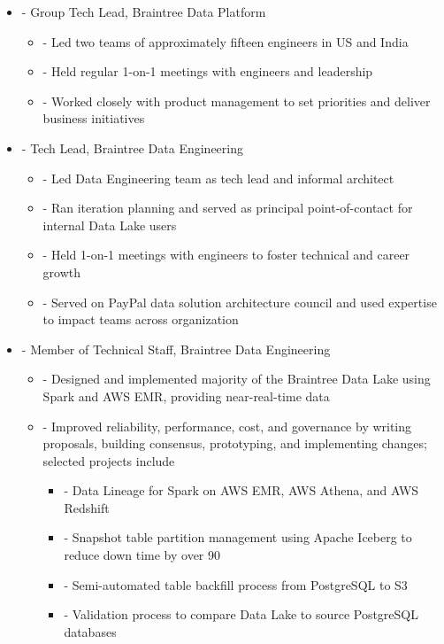\documentclass[a4paper,11pt]{article}
\newenvironment{pitemize}{
\begin{itemize}
\setlength{\itemsep}{.01in}
\setlength{\parskip}{.01in}
}
{\end{itemize}}
\begin{document}
\begin{pitemize}
    \item[-]Group Tech Lead, Braintree Data Platform
    \begin{pitemize}
        \item[-]Led two teams of approximately fifteen engineers in US and India
        \item[-]Held regular 1-on-1 meetings with engineers and leadership
        \item[-]Worked closely with product management to set priorities and deliver business initiatives
    \end{pitemize}
    \item[-]Tech Lead, Braintree Data Engineering
    \begin{pitemize}
        \item[-]Led Data Engineering team as tech lead and informal architect
        \item[-]Ran iteration planning and served as principal point-of-contact for internal Data Lake users
        \item[-]Held 1-on-1 meetings with engineers to foster technical and career growth
        \item[-]Served on PayPal data solution architecture council and used expertise to impact teams across organization
    \end{pitemize}
    \item[-]Member of Technical Staff, Braintree Data Engineering
    \begin{pitemize}
        \item[-]Designed and implemented majority of the Braintree Data Lake using Spark and AWS EMR, providing near-real-time data
        \item[-]Improved reliability, performance, cost, and governance by writing proposals, building consensus, prototyping, and implementing changes; selected projects include
        \begin{pitemize}
            \item[-]Data Lineage for Spark on AWS EMR, AWS Athena, and AWS Redshift
            \item[-]Snapshot table partition management using Apache Iceberg to reduce down time by over 90%
            \item[-]Semi-automated table backfill process from PostgreSQL to S3
            \item[-]Validation process to compare Data Lake to source PostgreSQL databases
        \end{pitemize}

\end{pitemize}
\end{pitemize}
\end{document}
